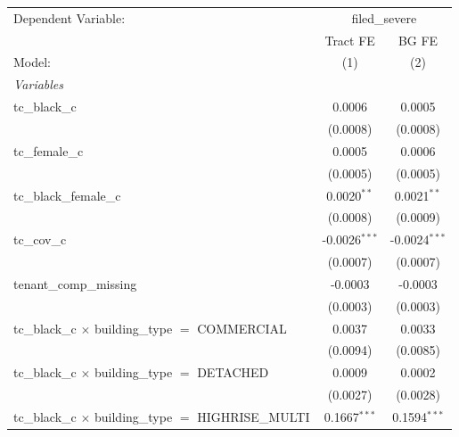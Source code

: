 \begin{tabular}{lcc}
   \tabularnewline \midrule \midrule
   Dependent Variable: & \multicolumn{2}{c}{filed\_severe}\\
                                                                       & Tract FE        & BG FE \\   
   Model:                                                              & (1)             & (2)\\  
   \midrule
   \emph{Variables}\\
   tc\_black\_c                                                        & 0.0006          & 0.0005\\   
                                                                       & (0.0008)        & (0.0008)\\   
   tc\_female\_c                                                       & 0.0005          & 0.0006\\   
                                                                       & (0.0005)        & (0.0005)\\   
   tc\_black\_female\_c                                                & 0.0020$^{**}$   & 0.0021$^{**}$\\   
                                                                       & (0.0008)        & (0.0009)\\   
   tc\_cov\_c                                                          & -0.0026$^{***}$ & -0.0024$^{***}$\\   
                                                                       & (0.0007)        & (0.0007)\\   
   tenant\_comp\_missing                                               & -0.0003         & -0.0003\\   
                                                                       & (0.0003)        & (0.0003)\\   
   tc\_black\_c $\times$ building\_type $=$ COMMERCIAL                 & 0.0037          & 0.0033\\   
                                                                       & (0.0094)        & (0.0085)\\   
   tc\_black\_c $\times$ building\_type $=$ DETACHED                   & 0.0009          & 0.0002\\   
                                                                       & (0.0027)        & (0.0028)\\   
   tc\_black\_c $\times$ building\_type $=$ HIGHRISE\_MULTI            & 0.1667$^{***}$  & 0.1594$^{***}$\\   

\end{tabular}

